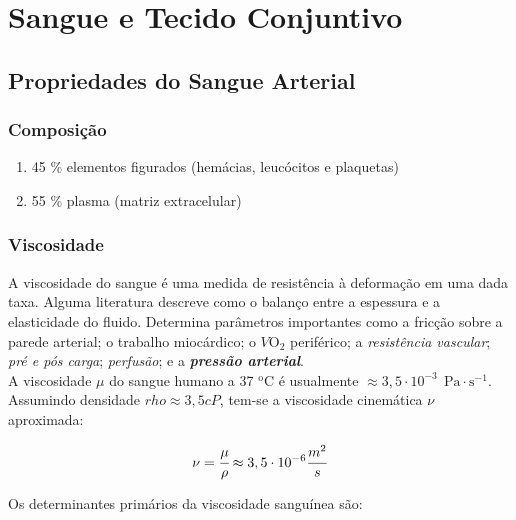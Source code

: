 \documentclass[a4paper,12pt]{article}
\begin{document}
\section*{Sangue e Tecido Conjuntivo}

\subsection*{Propriedades do Sangue Arterial}

\subsubsection*{Composição}

\begin{enumerate}
    \item 45 \% elementos figurados (hemácias, leucócitos e plaquetas)
    \item 55 \% plasma (matriz extracelular)
\end{enumerate}

\subsubsection*{Viscosidade} 

A viscosidade do sangue é uma medida de resistência à deformação em uma dada taxa. Alguma literatura descreve como o balanço entre a espessura e a elasticidade do fluido. Determina parâmetros importantes como a fricção sobre a parede arterial; o trabalho miocárdico; o $V\text{O}_{\mathrm{2}}$ periférico; a \emph{resistência vascular}; \emph{pré e pós carga}; \emph{perfusão}; e a \emph{\textbf{pressão arterial}}.\\

A viscosidade $\mu$ do sangue humano a 37 $^\text{o}$C é usualmente $\approx 3,5 \cdot 10^{-3} \ \ \text{Pa}\cdot{{\text{s}}^{-1}}$. Assumindo densidade $rho \approx 3,5 cP$, tem-se a viscosidade cinemática $\nu$ aproximada:

\begin{equation*}
    \nu = \cfrac{\mu}{\rho} \approx 3,5 \cdot 10^{-6} \cfrac{m^2}{s}
\end{equation*}

Os determinantes primários da viscosidade sanguínea são:
\end{document}
